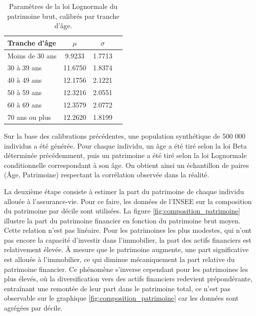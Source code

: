 \begin{table}[H]
\centering
\begin{tabular}{@{}lccc@{}}
\toprule
\textbf{Tranche d'âge} & $\mu$ & $\sigma$ \\
\midrule
Moins de 30 ans & 9.9233 & 1.7713 \\
30 à 39 ans & 11.6750 & 1.8374 \\
40 à 49 ans & 12.1756 & 2.1221 \\
50 à 59 ans & 12.3216 & 2.0551 \\
60 à 69 ans & 12.3579 & 2.0772 \\
70 ans ou plus & 12.2620 & 1.8199 \\
\bottomrule
\end{tabular}
\caption{Paramètres de la loi Lognormale du patrimoine brut, calibrés par tranche d'âge.}
\label{tab:params_patrimoine_age}
\end{table}




Sur la base des calibrations précédentes, une population synthétique de 500 000 individus a été générée. Pour chaque individu, un âge a été tiré selon la loi Beta déterminée précédemment, puis un patrimoine a été tiré selon la loi Lognormale conditionnelle correspondant à son âge. On obtient ainsi un échantillon de paires (Âge, Patrimoine) respectant la corrélation observée dans la réalité.

La deuxième étape consiste à estimer la part du patrimoine de chaque individu allouée à l'assurance-vie. Pour ce faire, les données de l'INSEE sur la composition du patrimoine par décile \cite{insee_patrimoine_age} sont utilisées. La figure \ref{fig:composition_patrimoine} illustre la part du patrimoine financier en fonction du patrimoine brut moyen. Cette relation n'est pas linéaire. Pour les patrimoines les plus modestes, qui n'ont pas encore la capacité d'investir dans l'immobilier, la part des actifs financiers est relativement élevée. À mesure que le patrimoine augmente, une part significative est allouée à l'immobilier, ce qui diminue mécaniquement la part relative du patrimoine financier. Ce phénomène s'inverse cependant pour les patrimoines les plus élevés, où la diversification vers des actifs financiers redevient prépondérante, entraînant une remontée de leur part dans le patrimoine total, ce n'est pas observable sur le graphique \ref{fig:composition_patrimoine} car les données sont agrégées par décile.

